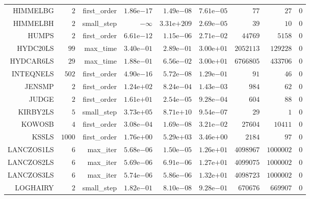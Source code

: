 \begin{longtable}{rrrrrrrrr}
HIMMELBG & \(     2\) & first\_order & \( 1.86\)e\(-17\) & \( 1.49\)e\(-08\) & \( 7.61\)e\(-05\) & \(    77\) & \(    27\) & \(     0\) \\
HIMMELBH & \(     2\) & small\_step & \(-\infty\) & \(3.31\)e\(+209\) & \( 2.69\)e\(-05\) & \(    39\) & \(    10\) & \(     0\) \\
HUMPS & \(     2\) & first\_order & \( 6.61\)e\(-12\) & \( 1.15\)e\(-06\) & \( 2.71\)e\(-02\) & \( 44769\) & \(  5158\) & \(     0\) \\
HYDC20LS & \(    99\) & max\_time & \( 3.40\)e\(-01\) & \( 2.89\)e\(-01\) & \( 3.00\)e\(+01\) & \(2052113\) & \(129228\) & \(     0\) \\
HYDCAR6LS & \(    29\) & max\_time & \( 1.88\)e\(-01\) & \( 6.56\)e\(-02\) & \( 3.00\)e\(+01\) & \(6766805\) & \(433706\) & \(     0\) \\
INTEQNELS & \(   502\) & first\_order & \( 4.90\)e\(-16\) & \( 5.72\)e\(-08\) & \( 1.29\)e\(-01\) & \(    91\) & \(    46\) & \(     0\) \\
JENSMP & \(     2\) & first\_order & \( 1.24\)e\(+02\) & \( 8.24\)e\(-04\) & \( 1.43\)e\(-03\) & \(   984\) & \(    62\) & \(     0\) \\
JUDGE & \(     2\) & first\_order & \( 1.61\)e\(+01\) & \( 2.54\)e\(-05\) & \( 9.28\)e\(-04\) & \(   604\) & \(    88\) & \(     0\) \\
KIRBY2LS & \(     5\) & small\_step & \( 3.73\)e\(+05\) & \( 8.71\)e\(+10\) & \( 9.54\)e\(-07\) & \(    29\) & \(     1\) & \(     0\) \\
KOWOSB & \(     4\) & first\_order & \( 3.08\)e\(-04\) & \( 1.69\)e\(-08\) & \( 3.21\)e\(-02\) & \( 27604\) & \( 10411\) & \(     0\) \\
KSSLS & \(  1000\) & first\_order & \( 1.76\)e\(+00\) & \( 5.29\)e\(+03\) & \( 3.46\)e\(+00\) & \(  2184\) & \(    97\) & \(     0\) \\
LANCZOS1LS & \(     6\) & max\_iter & \( 5.68\)e\(-06\) & \( 1.50\)e\(-05\) & \( 1.26\)e\(+01\) & \(4098967\) & \(1000002\) & \(     0\) \\
LANCZOS2LS & \(     6\) & max\_iter & \( 5.69\)e\(-06\) & \( 6.91\)e\(-06\) & \( 1.27\)e\(+01\) & \(4099075\) & \(1000002\) & \(     0\) \\
LANCZOS3LS & \(     6\) & max\_iter & \( 5.74\)e\(-06\) & \( 5.86\)e\(-06\) & \( 1.32\)e\(+01\) & \(4098723\) & \(1000002\) & \(     0\) \\
LOGHAIRY & \(     2\) & small\_step & \( 1.82\)e\(-01\) & \( 8.10\)e\(-08\) & \( 9.28\)e\(-01\) & \(670676\) & \(669907\) & \(     0\) \\

\end{longtable}
